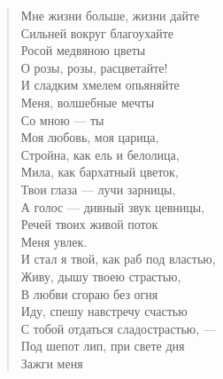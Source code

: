 \newpage
\vspace*{0cm}


\begin{verse}
\begin{patverse*}
Мне жизни больше, жизни дайте\ldotse\\
Сильней вокруг благоухайте\\
    Росой медвяною цветы\ldotse\\
О розы, розы, расцветайте!\\
И сладким хмелем опьяняйте\\
    Меня, волшебные мечты\ldotst\\
		Со мною --- ты\ldotst\\
Моя любовь, моя царица,\\
Стройна, как ель и белолица,\\
    Мила, как бархатный цветок,\\
Твои глаза --- лучи зарницы,\\
А голос --- дивный звук цевницы,\\
    Речей твоих живой поток\\
        Меня увлек.\\
И стал я твой, как раб под властью,\\
Живу, дышу твоею страстью,\\
    В любви сгораю без огня\ldotst\\
Иду, спешу навстречу счастью\\
С тобой отдаться сладострастью, ---\\
    Под шепот лип, при свете дня\ldotst\\
        Зажги меня\ldotst
\end{patverse*}
\end{verse}

\newpage
\vspace*{0cm}


